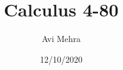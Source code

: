 \documentclass[12pt,paper=letter]{article}
\begin{document}
    \title{Calculus 4-80}
    \author{Avi Mehra}
    \date{12/10/2020}
    \maketitle


    \section{}
    


    \section{}
    


    \section{}
    


    \section{}
    


    \section{}
    


    \section{}
    


    \section{}
    


    \section{}
    
\end{document}
